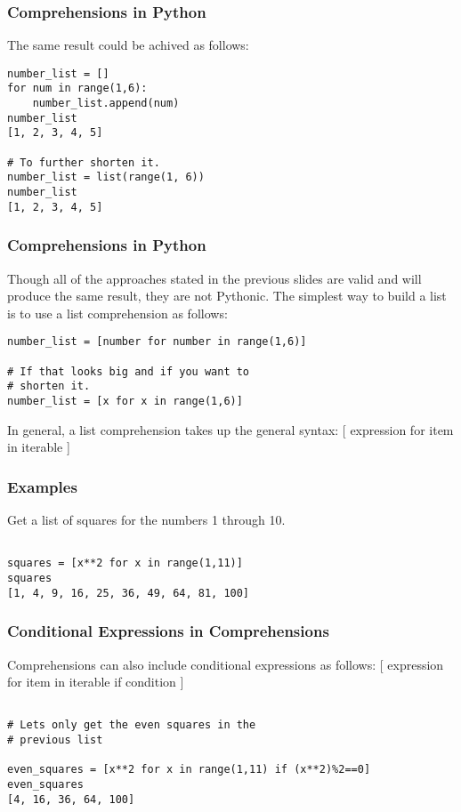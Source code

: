 \documentclass{beamer}
\begin{document}
\begin{frame}[fragile]
\frametitle{Comprehensions in Python}
The same result could be achived as follows:
\begin{lstlisting}
number_list = []
for num in range(1,6):
    number_list.append(num)
number_list
[1, 2, 3, 4, 5]

# To further shorten it.
number_list = list(range(1, 6))
number_list
[1, 2, 3, 4, 5]
\end{lstlisting}
\end{frame}

\begin{frame}[fragile]
\frametitle{Comprehensions in Python}
Though all of the approaches stated in the previous slides are valid and will produce the same result, they are not Pythonic. The simplest way to build a list is to use a list comprehension as follows:
\begin{lstlisting}
number_list = [number for number in range(1,6)]

# If that looks big and if you want to 
# shorten it.
number_list = [x for x in range(1,6)]

\end{lstlisting}

In general, a list comprehension takes up the general syntax:
[ expression for item in iterable ]
\end{frame}

\begin{frame}[fragile]
\frametitle{Examples}
Get a list of squares for the numbers 1 through 10.
\begin{lstlisting}

squares = [x**2 for x in range(1,11)]
squares
[1, 4, 9, 16, 25, 36, 49, 64, 81, 100]

\end{lstlisting}

\end{frame}

\begin{frame}[fragile]
\frametitle{Conditional Expressions in Comprehensions}
Comprehensions can also include conditional expressions as follows:
[ expression for item in iterable if condition ]
\begin{lstlisting}

# Lets only get the even squares in the
# previous list

even_squares = [x**2 for x in range(1,11) if (x**2)%2==0]
even_squares
[4, 16, 36, 64, 100]

\end{lstlisting}

\end{frame}
\end{document}
